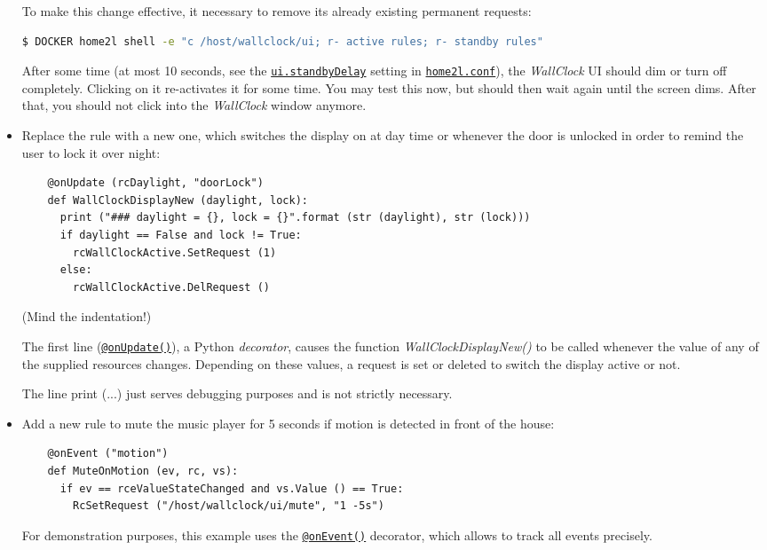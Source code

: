 \documentclass[12pt,english,parskip=half,headheight=19pt]{scrreprt}
\newcommand{\lst}[1]{\colorbox{lstbackground}{\footnotesize\code{#1}}}
\newcommand{\lstf}[1]{\colorbox{lstbackground}{\ttfamily\footnotesize#1}}
\newcommand{\idx}[1]{#1\index{#1}}
\newcommand{\refenv}[1]{\hyperref[env:#1]{\texttt{#1}}}        %
\newcommand{\reftool}[1]{\hyperref[tool:#1]{\texttt{\idx{#1}}}}
\newcommand{\refapipython}[1]{\href{home2l-api_python/index.html}{\mbox{\texttt{#1}}}}  %
\begin{document}
\begin{itemize}[$\blacktriangleright$]
  To make this change effective, it necessary to remove its already existing permanent requests:
  \begin{lstlisting}[language=bash]
    $ DOCKER home2l shell -e "c /host/wallclock/ui; r- active rules; r- standby rules"
  \end{lstlisting}

  After some time (at most 10 seconds, see the \refenv{ui.standbyDelay} setting in
  \reftool{home2l.conf}), the \textit{WallClock} UI should dim or turn off
  completely. Clicking on it re-activates it for some time. You may test
  this now, but should then wait again until the screen dims. After that,
  you should not click into the \textit{WallClock} window anymore.

\item
  Replace the \lst{WallClockDisplay} rule with a new one, which switches the display on
  at day time or whenever the door is unlocked in order to remind the user to
  lock it over night:
  \begin{lstlisting}
    @onUpdate (rcDaylight, "doorLock")
    def WallClockDisplayNew (daylight, lock):
      print ("### daylight = {}, lock = {}".format (str (daylight), str (lock)))
      if daylight == False and lock != True:
        rcWallClockActive.SetRequest (1)
      else:
        rcWallClockActive.DelRequest ()
  \end{lstlisting}

  (Mind the indentation!)

  The first line (\refapipython{@onUpdate()}), a Python \textit{decorator},
  causes the function \textit{WallClockDisplayNew()} to be called whenever
  the value of any of the supplied resources changes. Depending on these values, a
  request is set or deleted to switch the display active or not.

  The line \lstf{print (...)} just serves debugging purposes and is not strictly necessary.

\item
  Add a new rule to mute the music player for 5 seconds if motion is detected in
  front of the house:
  \begin{lstlisting}
    @onEvent ("motion")
    def MuteOnMotion (ev, rc, vs):
      if ev == rceValueStateChanged and vs.Value () == True:
        RcSetRequest ("/host/wallclock/ui/mute", "1 -5s")
  \end{lstlisting}
  For demonstration purposes, this example uses the \refapipython{@onEvent()} decorator,
  which allows to track all events precisely.


\end{itemize}
\end{document}
